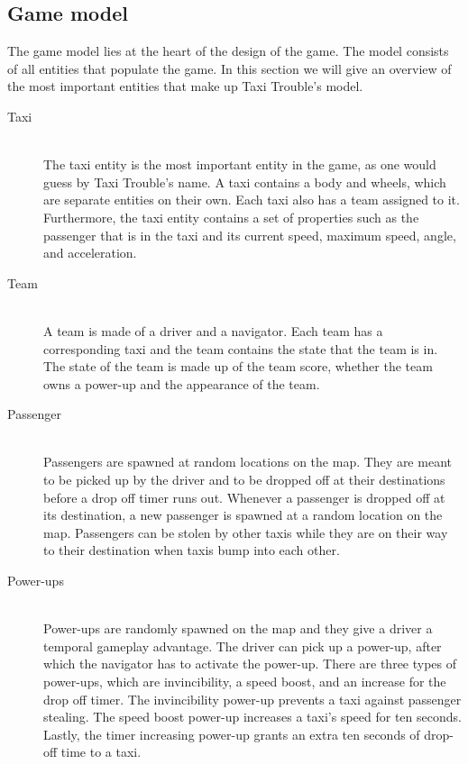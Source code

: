 \subsection*{Game model}
	The game model lies at the heart of the design of the game. The model consists of all entities that populate the game. In this section we will give an overview of the most important entities that make up Taxi Trouble's model.

\begin{description}
	\item[Taxi] \hfill \\
	 The taxi entity is the most important entity in the game, as one would guess by Taxi Trouble's name. A taxi contains a body and wheels, which are separate entities on their own. Each taxi also has a team assigned to it. Furthermore, the taxi entity contains a set of properties such as the passenger that is in the taxi and its current speed, maximum speed, angle, and acceleration.
	\item[Team] \hfill \\
	A team is made of a driver and a navigator. Each team has a corresponding taxi and the team contains the state that the team is in. The state of the team is made up of the team score, whether the team owns a power-up and the appearance of the team.
	\item[Passenger] \hfill \\
	Passengers are spawned at random locations on the map. They are meant to be picked up by the driver and to be dropped off at their destinations before a drop off timer runs out. Whenever a passenger is dropped off at its destination, a new passenger is spawned at a random location on the map. Passengers can be stolen by other taxis while they are on their way to their destination when taxis bump into each other.		
	\item[Power-ups] \hfill \\
	Power-ups are randomly spawned on the map and they give a driver a temporal gameplay advantage. The driver can pick up a power-up, after which the navigator has to activate the power-up. There are three types of power-ups, which are invincibility, a speed boost, and an increase for the drop off timer. The invincibility power-up prevents a taxi against passenger stealing. The speed boost power-up increases a taxi's speed for ten seconds. Lastly, the timer increasing power-up grants an extra ten seconds of drop-off time to a taxi.
\end{description}	

